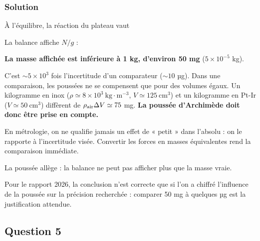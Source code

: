 \documentclass[11pt,a4paper]{article}
\newcommand{\equationajustee}[1]{%
  \sbox{\boiteequation}{$\displaystyle #1$}%
  \ifdim\wd\boiteequation>\linewidth
    \[\resizebox{\linewidth}{!}{\usebox{\boiteequation}}\]%
  \else
    \[#1\]%
  \fi}
\begin{document}
\hypertarget{solution-3}{%
\subsubsection{Solution}\label{solution-3}}

À l'équilibre, la réaction du plateau vaut

\equationajustee{N=mg-\rho_{\rm air}Vg .}

La balance affiche \(N/g\) :

\equationajustee{m_{\rm aff}=m-\rho_{\rm air}V .}

\textbf{La masse affichée est inférieure à 1 kg, d'environ 50 mg} (\(5\times10^{-5}\) kg).

C'est \(\sim5\times10^3\) fois l'incertitude d'un comparateur (\(\sim10\) µg). Dans une comparaison, les poussées ne se compensent que pour des volumes égaux. Un kilogramme en inox (\(\rho\simeq8\times10^3\ \mathrm{kg\cdot m^{-3}}\), \(V\simeq125\ \mathrm{cm^3}\)) et un kilogramme en Pt-Ir (\(V\simeq50\ \mathrm{cm^3}\)) diffèrent de \(\rho_{\rm air}\Delta V\simeq75\) mg. \textbf{La poussée d'Archimède doit donc être prise en compte.}

\begin{methode}

En métrologie, on ne qualifie jamais un effet de « petit » dans l'absolu : on le rapporte à l'incertitude visée. Convertir les forces en masses équivalentes rend la comparaison immédiate.

\end{methode}

\begin{piege}

La poussée allège : la balance ne peut pas afficher plus que la masse vraie.

\end{piege}

\begin{jury}

Pour le rapport 2026, la conclusion n'est correcte que si l'on a chiffré l'influence de la poussée sur la précision recherchée : comparer 50 mg à quelques µg est la justification attendue.

\end{jury}

\hypertarget{question-5}{%
\subsection{Question 5}\label{question-5}}
\end{document}
